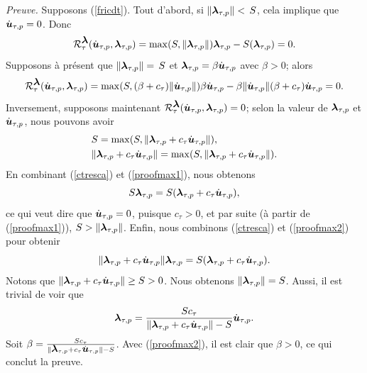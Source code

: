 \noindent \textit{Preuve.} Supposons (\ref{fricdt}). Tout d'abord, si $\|\mbox{\boldmath{$\lambda$}}_{\tau, p}\|<\,S$, cela implique que $\dot{\mbox{\boldmath{$u$}}}_{\tau, p}=0$. Donc
\begin{equation}
{\cal R}_{\tau}^{\mbox{\boldmath{$\lambda$}}}(\dot{\mbox{\boldmath{$u$}}}_{\tau, p},\mbox{\boldmath{$\lambda$}}_{\tau, p})=\max ( S, \|\mbox{\boldmath{$\lambda$}}_{\tau, p}\|)\mbox{\boldmath{$\lambda$}}_{\tau, p}- S (\mbox{\boldmath{$\lambda$}}_{\tau, p})=0.
\end{equation}
Supposons à présent que $\|\mbox{\boldmath{$\lambda$}}_{\tau, p}\|=\,S$ et $\mbox{\boldmath{$\lambda$}}_{\tau, p}=\beta \dot{\mbox{\boldmath{$u$}}}_{\tau, p}$ avec $\beta>0$; alors
\begin{equation}
{\cal R}_{\tau}^{\mbox{\boldmath{$\lambda$}}}(\dot{\mbox{\boldmath{$u$}}}_{\tau, p},\mbox{\boldmath{$\lambda$}}_{\tau, p})=\max ( S, (\beta +c_\tau)\| \dot{\mbox{\boldmath{$u$}}}_{\tau, p}\|)\beta \dot{\mbox{\boldmath{$u$}}}_{\tau, p}-\beta\|\dot{\mbox{\boldmath{$u$}}}_{\tau, p}\| (\beta +c_\tau) \dot{\mbox{\boldmath{$u$}}}_{\tau, p}=0.
\end{equation}
Inversement, supposons maintenant ${\cal R}_{\tau}^{\mbox{\boldmath{$\lambda$}}}(\dot{\mbox{\boldmath{$u$}}}_{\tau, p},\mbox{\boldmath{$\lambda$}}_{\tau, p})=0$; selon la valeur de $\mbox{\boldmath{$\lambda$}}_{\tau, p}$ et $\dot{\mbox{\boldmath{$u$}}}_{\tau, p}$, nous pouvons avoir 
\begin{align}
& S=\max ( S, \|\mbox{\boldmath{$\lambda$}}_{\tau, p}+c_\tau \dot{\mbox{\boldmath{$u$}}}_{\tau, p}\|),\label{proofmax1}\\
&\|\mbox{\boldmath{$\lambda$}}_{\tau, p}+c_\tau \dot{\mbox{\boldmath{$u$}}}_{\tau, p}\|=\max ( S, \|\mbox{\boldmath{$\lambda$}}_{\tau, p}+c_\tau \dot{\mbox{\boldmath{$u$}}}_{\tau, p}\|)\label{proofmax2}.
\end{align}
En combinant (\ref{ctresca}) et (\ref{proofmax1}), nous obtenons
\begin{equation}
 S\mbox{\boldmath{$\lambda$}}_{\tau, p}= S (\mbox{\boldmath{$\lambda$}}_{\tau, p}+c_\tau \dot{\mbox{\boldmath{$u$}}}_{\tau, p}),
\end{equation}
ce qui veut dire que $\dot{\mbox{\boldmath{$u$}}}_{\tau, p}=0$, puisque $c_\tau>0$, et par suite  (à partir de (\ref{proofmax1})), $ S>\|\mbox{\boldmath{$\lambda$}}_{\tau, p}\|$.
Enfin, nous combinons (\ref{ctresca}) et (\ref{proofmax2}) pour obtenir
\begin{equation}
\|\mbox{\boldmath{$\lambda$}}_{\tau, p}+c_\tau \dot{\mbox{\boldmath{$u$}}}_{\tau, p}\|\mbox{\boldmath{$\lambda$}}_{\tau, p}= S (\mbox{\boldmath{$\lambda$}}_{\tau, p}+c_\tau \dot{\mbox{\boldmath{$u$}}}_{\tau, p}).
\end{equation}
Notons que $\|\mbox{\boldmath{$\lambda$}}_{\tau, p}+c_\tau \dot{\mbox{\boldmath{$u$}}}_{\tau, p}\|\ge S>0$. Nous obtenons $\|\mbox{\boldmath{$\lambda$}}_{\tau, p}\|=S$. Aussi, il est trivial de voir que
\begin{equation}
\mbox{\boldmath{$\lambda$}}_{\tau, p}= \frac{Sc_\tau}{\|\mbox{\boldmath{$\lambda$}}_{\tau, p}+c_\tau \dot{\mbox{\boldmath{$u$}}}_{\tau, p}\|-S} \dot{\mbox{\boldmath{$u$}}}_{\tau, p}.
\end{equation}
Soit $\beta=\frac{Sc_\tau}{\|\mbox{\boldmath{$\lambda$}}_{\tau, p}+c_\tau \dot{\mbox{\boldmath{$u$}}}_{\tau, p}\|-S}$. Avec (\ref{proofmax2}), il est clair que $\beta> 0$, ce qui conclut la preuve.

